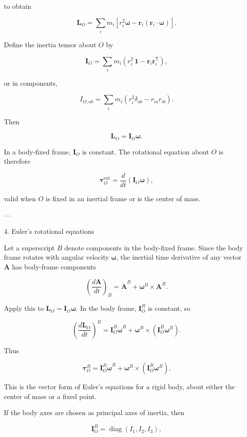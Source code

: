 \documentclass[a4paper,11pt]{article}
\begin{document}
to obtain

\[
\mathbf L_O
=
\sum_i m_i
\left[
r_i^2\boldsymbol\omega
-
\mathbf r_i(\mathbf r_i\cdot\boldsymbol\omega)
\right].
\]

Define the inertia tensor about \(O\) by

\[
\boxed{
\mathbf I_O
=
\sum_i m_i
\left(
r_i^2\,\mathbf 1
-
\mathbf r_i\mathbf r_i^{\mathsf T}
\right),
}
\]

or in components,

\[
I_{O,ab}
=
\sum_i m_i
\left(
r_i^2\delta_{ab}
-
r_{ia}r_{ib}
\right).
\]

Then

\[
\boxed{
\mathbf L_O=\mathbf I_O\boldsymbol\omega .
}
\]

In a body-fixed frame, \(\mathbf I_O\) is constant. The rotational equation about \(O\) is therefore

\[
\boldsymbol\tau_O^{\mathrm{ext}}
=
\frac{d}{dt}\left(\mathbf I_O\boldsymbol\omega\right),
\]

valid when \(O\) is fixed in an inertial frame or is the center of mass.

---

4. Euler’s rotational equations

Let a superscript \(B\) denote components in the body-fixed frame. Since the body frame rotates with angular velocity \(\boldsymbol\omega\), the inertial time derivative of any vector \(\mathbf A\) has body-frame components

\[
\left(\frac{d\mathbf A}{dt}\right)_{\!B}
=
\dot{\mathbf A}^{B}
+
\boldsymbol\omega^{B}\times\mathbf A^{B}.
\]

Apply this to \(\mathbf L_O=\mathbf I_O\boldsymbol\omega\). In the body frame, \(\mathbf I_O^{B}\) is constant, so

\[
\left(\frac{d\mathbf L_O}{dt}\right)^{B}
=
\mathbf I_O^{B}\dot{\boldsymbol\omega}^{B}
+
\boldsymbol\omega^{B}
\times
\left(\mathbf I_O^{B}\boldsymbol\omega^{B}\right).
\]

Thus

\[
\boxed{
\boldsymbol\tau_O^{B}
=
\mathbf I_O^{B}\dot{\boldsymbol\omega}^{B}
+
\boldsymbol\omega^{B}
\times
\left(\mathbf I_O^{B}\boldsymbol\omega^{B}\right).
}
\]

This is the vector form of Euler’s equations for a rigid body, about either the center of mass or a fixed point.

If the body axes are chosen as principal axes of inertia, then

\[
\mathbf I_O^{B}
=
\operatorname{diag}(I_1,I_2,I_3),
\]
\end{document}
